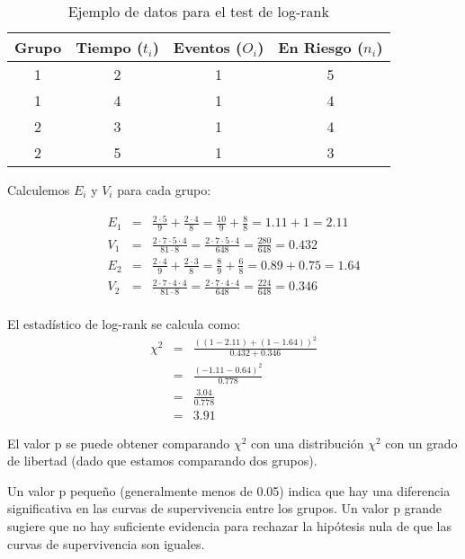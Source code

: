 \documentclass[a4paper]{report} %
\begin{document}
\begin{table}[h]
\centering
\begin{tabular}{|c|c|c|c|}
\hline
Grupo & Tiempo ($t_i$) & Eventos ($O_i$) & En Riesgo ($n_i$) \\
\hline
1 & 2 & 1 & 5 \\
1 & 4 & 1 & 4 \\
2 & 3 & 1 & 4 \\
2 & 5 & 1 & 3 \\
\hline
\end{tabular}
\caption{Ejemplo de datos para el test de log-rank}
\end{table}

Calculemos $E_i$ y $V_i$ para cada grupo:

\begin{eqnarray*}
E_1 &=& \frac{2 \cdot 5}{9} + \frac{2 \cdot 4}{8} = \frac{10}{9} + \frac{8}{8} = 1.11 + 1 = 2.11 \\
V_1 &=& \frac{2 \cdot 7 \cdot 5 \cdot 4}{81 \cdot 8} = \frac{2 \cdot 7 \cdot 5 \cdot 4}{648} = \frac{280}{648} = 0.432 \\
E_2 &=& \frac{2 \cdot 4}{9} + \frac{2 \cdot 3}{8} = \frac{8}{9} + \frac{6}{8} = 0.89 + 0.75 = 1.64 \\
V_2 &=& \frac{2 \cdot 7 \cdot 4 \cdot 4}{81 \cdot 8} = \frac{2 \cdot 7 \cdot 4 \cdot 4}{648} = \frac{224}{648} = 0.346 \\
\end{eqnarray*}

El estad\'istico de log-rank se calcula como:
\begin{eqnarray*}
\chi^2 &=& \frac{\left((1 - 2.11) + (1 - 1.64)\right)^2}{0.432 + 0.346} \\
       &=& \frac{\left(-1.11 - 0.64\right)^2}{0.778} \\
       &=& \frac{3.04}{0.778} \\
       &=& 3.91
\end{eqnarray*}

El valor p se puede obtener comparando $\chi^2$ con una distribuci\'on $\chi^2$ con un grado de libertad (dado que estamos comparando dos grupos).

Un valor p peque\~no (generalmente menos de 0.05) indica que hay una diferencia significativa en las curvas de supervivencia entre los grupos. Un valor p grande sugiere que no hay suficiente evidencia para rechazar la hip\'otesis nula de que las curvas de supervivencia son iguales.
\end{document}
